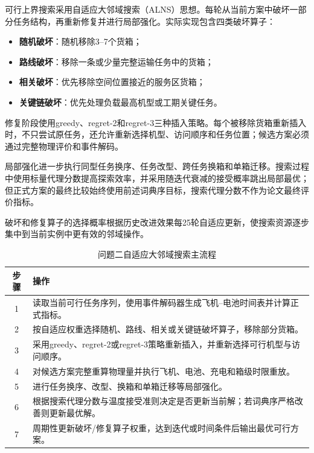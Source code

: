 \documentclass[UTF8,a4paper,12pt]{ctexart}
\begin{document}
可行上界搜索采用自适应大邻域搜索（ALNS）思想。每轮从当前方案中破坏一部分任务结构，再重新修复并进行局部强化。实际实现包含四类破坏算子：

\begin{itemize}
  \item \textbf{随机破坏}：随机移除3--7个货箱；
  \item \textbf{路线破坏}：移除一条或少量完整运输任务中的货箱；
  \item \textbf{相关破坏}：优先移除空间位置接近的服务区货箱；
  \item \textbf{关键链破坏}：优先处理负载最高机型或工期关键任务。
\end{itemize}

修复阶段使用greedy、regret-2和regret-3三种插入策略。每个被移除货箱重新插入时，不只尝试原任务，还允许重新选择机型、访问顺序和任务位置；候选方案必须通过完整物理评价和事件解码。

局部强化进一步执行同型任务换序、任务改型、跨任务换箱和单箱迁移。搜索过程中使用标量代理分数提高探索效率，并采用随迭代衰减的接受概率跳出局部最优；但正式方案的最终比较始终使用前述词典序目标，搜索代理分数不作为论文最终评价指标。

破坏和修复算子的选择概率根据历史改进效果每25轮自适应更新，使搜索资源逐步集中到当前实例中更有效的邻域操作。

\begin{table}[H]
\centering
\caption{问题二自适应大邻域搜索主流程}
\label{tab:q2_alns_steps}
\begin{tabularx}{0.96\textwidth}{cX}
\toprule
步骤 & 操作\\
\midrule
1 & 读取当前可行任务序列，使用事件解码器生成飞机--电池时间表并计算正式指标。\\
2 & 按自适应权重选择随机、路线、相关或关键链破坏算子，移除部分货箱。\\
3 & 采用greedy、regret-2或regret-3策略重新插入，并重新选择可行机型与访问顺序。\\
4 & 对候选方案完整重算物理量并执行飞机、电池、充电和箱级时限重放。\\
5 & 进行任务换序、改型、换箱和单箱迁移等局部强化。\\
6 & 根据搜索代理分数与温度接受准则决定是否更新当前解；若词典序严格改善则更新最优解。\\
7 & 周期性更新破坏/修复算子权重，达到迭代或时间条件后输出最优可行方案。\\
\bottomrule
\end{tabularx}
\end{table}
\end{document}
